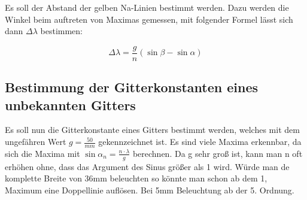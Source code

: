 \documentclass[a4paper,titlepage]{scrartcl}
\numberwithin{equation}{section}
\begin{document}
Es soll der Abstand der gelben Na-Linien bestimmt werden. Dazu werden die Winkel beim auftreten von Maximas gemessen, mit folgender Formel lässt sich dann $\Delta \lambda$ bestimmen:
 
\begin{equation}
\Delta \lambda = \frac{g}{n}\left(\sin{\beta} - \sin{\alpha}\right)
\end{equation}
 
\subsection{Bestimmung der Gitterkonstanten eines unbekannten Gitters}
 
Es soll nun die Gitterkonstante eines Gitters bestimmt werden, welches mit dem ungefähren Wert $g= \frac{50}{mm}$ gekennzeichnet ist. Es sind viele Maxima erkennbar, da sich die Maxima mit $\sin{\alpha_n} = \frac{n \cdot \lambda}{g}$ berechnen. Da g sehr groß ist, kann man n oft erhöhen ohne, dass das Argument des Sinus größer als 1 wird. Würde man de komplette Breite von 36mm beleuchten so könnte man schon ab dem 1, Maximum eine Doppellinie auflösen. Bei 5mm Beleuchtung ab der 5. Ordnung.

\newpage


\end{document}
